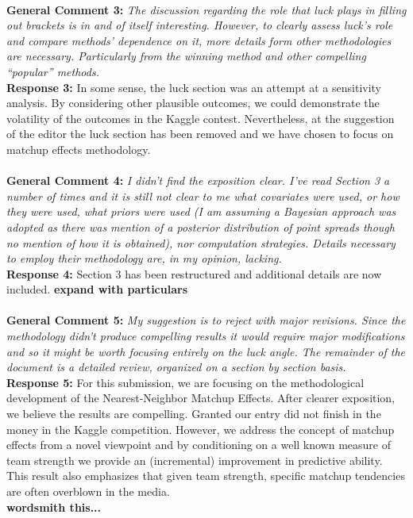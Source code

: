 \documentclass[11pt]{article} %
\begin{document}
\\
{\bf General Comment 3:} \emph{The discussion regarding the role that luck plays in filling out brackets is in and of itself interesting. However, to clearly assess luck's role and compare methods' dependence on it, more details form other methodologies are necessary. Particularly from the winning method and other compelling ``popular'' methods.}\\
{\bf Response 3:} In some sense, the luck section was an attempt at a sensitivity analysis. By considering other plausible outcomes, we could demonstrate the volatility of the outcomes in the Kaggle contest. Nevertheless, at the suggestion of the editor the luck section has been removed and we have chosen to focus on matchup effects methodology.\\
\\
{\bf General Comment 4:} \emph{I didn't find the exposition clear. I've read Section 3 a number of times and it is still not clear to me what covariates were used, or how they were used, what priors were used (I am assuming a Bayesian approach was adopted as there was mention of a posterior distribution of point spreads though no mention of how it is obtained), nor computation strategies. Details necessary to employ their methodology are, in my opinion, lacking.}\\
{\bf Response 4:} Section 3 has been restructured and additional details are now included. {\bf expand with particulars}\\
\\
{\bf General Comment 5:} \emph{My suggestion is to reject with major revisions. Since the methodology didn't produce compelling results it would require major modifications and so it might be worth focusing entirely on the luck angle. The remainder of the document is a detailed review, organized on a section by section basis.}\\
{\bf Response 5:} For this submission, we are focusing on the methodological development of the Nearest-Neighbor Matchup Effects. After clearer exposition, we believe the results are compelling. Granted our entry did not finish in the money in the Kaggle competition. However, we address the concept of matchup effects from a novel viewpoint and by conditioning on a well known measure of team strength we provide an (incremental) improvement in predictive ability. This result also emphasizes that given team strength, specific matchup tendencies are often overblown in the media.\\ {\bf wordsmith this...}\\
\end{document}
